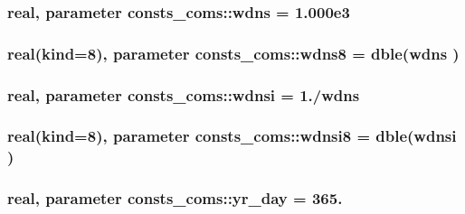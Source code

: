 \subsubsection[{\texorpdfstring{wdns}{wdns}}]{\setlength{\rightskip}{0pt plus 5cm}real, parameter consts\+\_\+coms\+::wdns = 1.\+000e3}\hypertarget{namespaceconsts__coms_a831ac48090426d5432c26edb7cbac367}{}\label{namespaceconsts__coms_a831ac48090426d5432c26edb7cbac367}
\subsubsection[{\texorpdfstring{wdns8}{wdns8}}]{\setlength{\rightskip}{0pt plus 5cm}real(kind=8), parameter consts\+\_\+coms\+::wdns8 = dble({\bf wdns} )}\hypertarget{namespaceconsts__coms_a463ad608b496ab02211a70ecfb8ed002}{}\label{namespaceconsts__coms_a463ad608b496ab02211a70ecfb8ed002}
\subsubsection[{\texorpdfstring{wdnsi}{wdnsi}}]{\setlength{\rightskip}{0pt plus 5cm}real, parameter consts\+\_\+coms\+::wdnsi = 1./{\bf wdns}}\hypertarget{namespaceconsts__coms_a78d4f96ff3c5c11fd36ccb8ccc403232}{}\label{namespaceconsts__coms_a78d4f96ff3c5c11fd36ccb8ccc403232}
\subsubsection[{\texorpdfstring{wdnsi8}{wdnsi8}}]{\setlength{\rightskip}{0pt plus 5cm}real(kind=8), parameter consts\+\_\+coms\+::wdnsi8 = dble({\bf wdnsi} )}\hypertarget{namespaceconsts__coms_ab48d9b767c6f90fe96cddded773dc846}{}\label{namespaceconsts__coms_ab48d9b767c6f90fe96cddded773dc846}
\subsubsection[{\texorpdfstring{yr\+\_\+day}{yr_day}}]{\setlength{\rightskip}{0pt plus 5cm}real, parameter consts\+\_\+coms\+::yr\+\_\+day = 365.}\hypertarget{namespaceconsts__coms_adad953349aafb445de8a82640081a357}{}\label{namespaceconsts__coms_adad953349aafb445de8a82640081a357}
